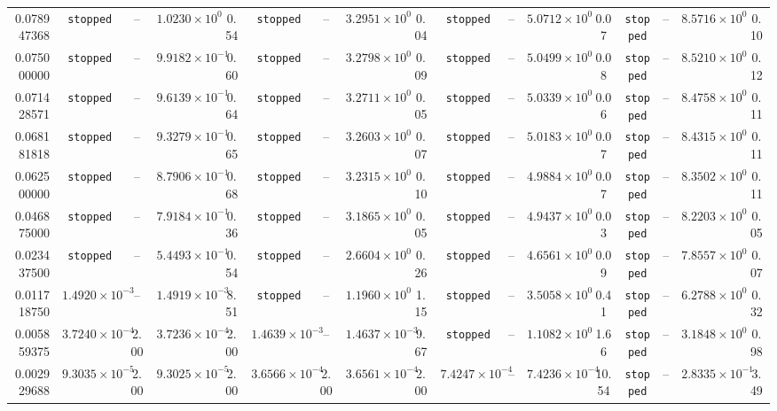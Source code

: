 \begin{table}
{\begin{tabular}{r cc cc cc cc cc cc cc cc }
0.078947368 & \texttt{stopped} & -- & $1.0230\times10^{0}$ & 0.54 & \texttt{stopped} & -- & $3.2951\times10^{0}$ & 0.04 & \texttt{stopped} & -- & $5.0712\times10^{0}$ & 0.07 & \texttt{stopped} & -- & $8.5716\times10^{0}$ & 0.10 \\
0.075000000 & \texttt{stopped} & -- & $9.9182\times10^{-1}$ & 0.60 & \texttt{stopped} & -- & $3.2798\times10^{0}$ & 0.09 & \texttt{stopped} & -- & $5.0499\times10^{0}$ & 0.08 & \texttt{stopped} & -- & $8.5210\times10^{0}$ & 0.12 \\
0.071428571 & \texttt{stopped} & -- & $9.6139\times10^{-1}$ & 0.64 & \texttt{stopped} & -- & $3.2711\times10^{0}$ & 0.05 & \texttt{stopped} & -- & $5.0339\times10^{0}$ & 0.06 & \texttt{stopped} & -- & $8.4758\times10^{0}$ & 0.11 \\
0.068181818 & \texttt{stopped} & -- & $9.3279\times10^{-1}$ & 0.65 & \texttt{stopped} & -- & $3.2603\times10^{0}$ & 0.07 & \texttt{stopped} & -- & $5.0183\times10^{0}$ & 0.07 & \texttt{stopped} & -- & $8.4315\times10^{0}$ & 0.11 \\
0.062500000 & \texttt{stopped} & -- & $8.7906\times10^{-1}$ & 0.68 & \texttt{stopped} & -- & $3.2315\times10^{0}$ & 0.10 & \texttt{stopped} & -- & $4.9884\times10^{0}$ & 0.07 & \texttt{stopped} & -- & $8.3502\times10^{0}$ & 0.11 \\
0.046875000 & \texttt{stopped} & -- & $7.9184\times10^{-1}$ & 0.36 & \texttt{stopped} & -- & $3.1865\times10^{0}$ & 0.05 & \texttt{stopped} & -- & $4.9437\times10^{0}$ & 0.03 & \texttt{stopped} & -- & $8.2203\times10^{0}$ & 0.05 \\
0.023437500 & \texttt{stopped} & -- & $5.4493\times10^{-1}$ & 0.54 & \texttt{stopped} & -- & $2.6604\times10^{0}$ & 0.26 & \texttt{stopped} & -- & $4.6561\times10^{0}$ & 0.09 & \texttt{stopped} & -- & $7.8557\times10^{0}$ & 0.07 \\
0.011718750 & $1.4920\times10^{-3}$ & -- & $1.4919\times10^{-3}$ & 8.51 & \texttt{stopped} & -- & $1.1960\times10^{0}$ & 1.15 & \texttt{stopped} & -- & $3.5058\times10^{0}$ & 0.41 & \texttt{stopped} & -- & $6.2788\times10^{0}$ & 0.32 \\
0.005859375 & $3.7240\times10^{-4}$ & 2.00 & $3.7236\times10^{-4}$ & 2.00 & $1.4639\times10^{-3}$ & -- & $1.4637\times10^{-3}$ & 9.67 & \texttt{stopped} & -- & $1.1082\times10^{0}$ & 1.66 & \texttt{stopped} & -- & $3.1848\times10^{0}$ & 0.98 \\
0.002929688 & $9.3035\times10^{-5}$ & 2.00 & $9.3025\times10^{-5}$ & 2.00 & $3.6566\times10^{-4}$ & 2.00 & $3.6561\times10^{-4}$ & 2.00 & $7.4247\times10^{-4}$ & -- & $7.4236\times10^{-4}$ & 10.54 & \texttt{stopped} & -- & $2.8335\times10^{-1}$ & 3.49 \\
\bottomrule
\end{tabular}}
\end{table}
